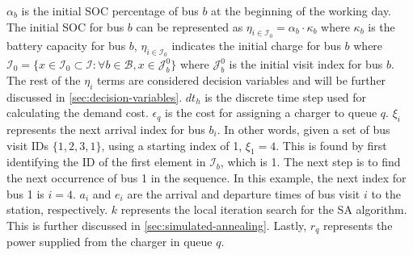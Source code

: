 \documentclass[11pt,a4paper,final]{article}
\newcommand{\Iset}{\mathcal{I}}             %
\newcommand{\Isetinit}{\mathcal{I}_0}       %
\newcommand{\Bset}{\mathcal{B}}             %
\newcommand{\Jset}{\mathcal{J}}             %
\begin{document}
\(\alpha_b\) is the initial SOC percentage of bus \(b\) at the beginning of the working day. The initial SOC for bus \(b\) can be
represented as \(\eta_{i \in \Isetinit} = \alpha_b \cdot \kappa_b\) where \(\kappa_b\) is the battery capacity for bus \(b\), \(\eta_{i \in \Isetinit}\)
indicates the initial charge for bus \(b\) where \(\Isetinit = \{ x \in \Isetinit \subset \Iset : \forall b \in \Bset, x \in \Jset_b^0 \}\)
where \(\Jset_b^0\) is the initial visit index for bus \(b\). The rest of the \(\eta_i\) terms are considered decision variables
and will be further discussed in \ref{sec:decision-variables}. \(dt_h\) is the discrete time step used for calculating the
demand cost. \(\epsilon_q\) is the cost for assigning a charger to queue \(q\). \(\xi_i\) represents the next arrival index for bus
\(b_i\). In other words, given a set of bus visit IDs \(\{ 1,2,3,1\}\), using a starting index of 1, \(\xi_1 = 4\). This is
found by first identifying the ID of the first element in \(\Iset_b\), which is 1. The next step is to find the next
occurrence of bus 1 in the sequence. In this example, the next index for bus 1 is \(i= 4\). \(a_i\) and \(e_i\) are the
arrival and departure times of bus visit \(i\) to the station, respectively. \(k\) represents the local iteration search for
the SA algorithm. This is further discussed in \ref{sec:simulated-annealing}. Lastly, \(r_q\) represents the power supplied
from the charger in queue \(q\).
\end{document}
